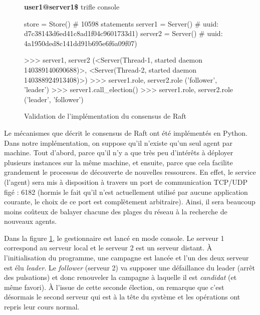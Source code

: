 \begin{figure}[h]

    \scriptsize
    \begin{myverbatim}[commandchars=\\\{\},codes={\catcode`$=3\catcode`_=8}]
\textbf{user1@server1\$} trifle console

store   = Store()  # 10598 statements
server1 = Server() # uuid: d7c38143d6ed41c8ad1f04c9601733d1)
server2 = Server() # uuid: 4a1950ded8c141dd91b695e6f6a09f07)

>>> server1, server2
(<Server(Thread-1, started daemon 140389140690688)>, 
 <Server(Thread-2, started daemon 140388924913408)>)
>>> server1.role, server2.role
('follower', 'leader')
>>> server1.call\_election()
>>> server1.role, server2.role
('leader', 'follower')
    \end{myverbatim}
  \caption{Validation de l'implémentation du consensus de Raft}
  \label{fig:raft}
\end{figure}

Le mécanismes que décrit le consensus de Raft ont été implémentés en Python.
Dans notre implémentation, on suppose qu'il n'existe qu'un seul agent par
machine. Tout d'abord, parce qu'il n'y a que très peu d'intérêts à déployer
plusieurs instances sur la même machine, et ensuite, parce que cela facilite
grandement le processus de découverte de nouvelles ressources. En effet, le
service (l'agent) sera mis à disposition à travers un port de communication
TCP/UDP figé : 6182 (hormis le fait qu'il n'est actuellement utilisé par aucune
application courante, le choix de ce port est complètement arbitraire). Ainsi,
il sera beaucoup moins coûteux de balayer chacune des plages du réseau à la
recherche de nouveaux agents.

Dans la figure \ref{fig:raft}, le gestionnaire est lancé en mode console. Le
serveur 1 correspond au serveur local et le serveur 2 est un serveur distant. À
l'initialisation du programme, une campagne est lancée et l'un des deux serveur
est élu \emph{leader}. Le \emph{follower} (serveur 2) va supposer une
défaillance du leader (arrêt des pulsations) et donc renouveler la campagne à
laquelle il est \emph{candidat} (et même favori). À l'issue de cette seconde
élection, on remarque que c'est désormais le second serveur qui est à la tête du
système et les opérations ont repris leur cours normal.

